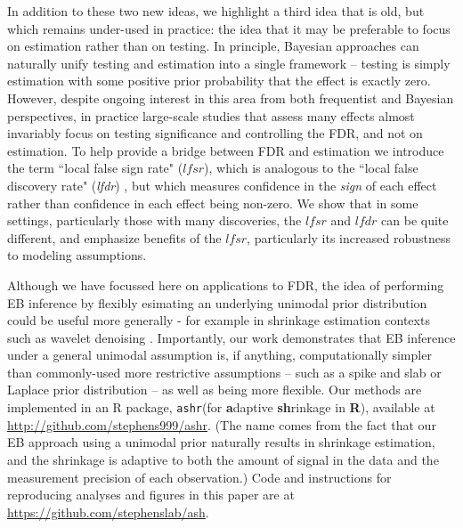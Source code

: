 \documentclass[11pt]{article}
\def\lfdr{\textit{lfdr}}
\def\lfsr{\textit{lfsr}}
\def\ashr{{\tt ashr}\xspace}
\begin{document}
In addition to these two new ideas, we highlight a third idea that is old, but which remains under-used in practice:
the idea that it may be preferable to focus on estimation rather than on testing.
In principle, Bayesian approaches can naturally unify testing and estimation into a single framework -- testing is
simply estimation with some positive prior probability that the effect is exactly zero.
However, despite ongoing interest in this area from both frequentist \cite{benjamini2005false} and Bayesian \cite{zhao2012empirical,gelman2012we} 
perspectives, in practice large-scale studies that assess many effects almost invariably focus on testing significance and
controlling the FDR, and not on estimation. To help provide a bridge between FDR and estimation we introduce the term
``local false sign rate" ($\lfsr$), which is analogous to the ``local false discovery rate" (\lfdr) \cite{efron2008microarrays}, but which measures confidence  
in the {\it sign} of each effect rather than confidence in each effect being non-zero. We show that in some settings, particularly those with many discoveries, 
the $\lfsr$ and $\lfdr$ can be quite different, and emphasize benefits of the $\lfsr$, particularly its increased robustness to modeling assumptions. 



Although we have focussed here on applications to FDR, the idea of performing EB inference by flexibly esimating an underlying unimodal prior distribution
could be useful more generally - for example in shrinkage estimation contexts such as wavelet denoising \cite{donoho:1995}. 
Importantly, our work demonstrates that EB inference under a general unimodal assumption is, if anything, computationally simpler  
than commonly-used more restrictive assumptions -- such as a spike and slab or Laplace prior distribution \cite{johnstone2004needles} --  as well as being more flexible.
Our methods are implemented in an R package, \ashr (for {\bf a}daptive {\bf sh}rinkage in {\bf R}), available at 
\href{http://github.com/stephens999/ashr}{http://github.com/stephens999/ashr}.
(The name comes from the fact that our EB approach using a unimodal prior naturally results in shrinkage estimation,
and the shrinkage is adaptive to both the amount of signal in the data and the measurement precision of each observation.) 
Code and instructions for reproducing analyses and figures in this paper are at
\href{https://github.com/stephenslab/ash}{https://github.com/stephenslab/ash}.
\end{document}
